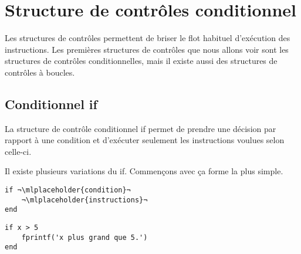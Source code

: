 \documentclass{tufte-handout}
\begin{document}
\section{Structure de contrôles conditionnel}
Les structures de contrôles permettent de briser le flot habituel d'exécution des instructions. Les premières structures de contrôles que nous allons voir sont les structures de contrôles conditionnelles, mais il existe aussi des structures de contrôles à boucles.
\subsection{Conditionnel if}
La structure de contrôle conditionnel if permet de prendre une décision par rapport à une condition et d'exécuter seulement les instructions voulues selon celle-ci.

Il existe plusieurs variations du if. Commençons avec ça forme la plus simple.

\begin{fullwidth}
    \begin{minipage}{.45\linewidth}
    \begin{lstlisting}[title={Structure du if simple}]
if ¬\mlplaceholder{condition}¬
    ¬\mlplaceholder{instructions}¬
end
    \end{lstlisting}
    \end{minipage}\hfill
    \begin{minipage}{.45\linewidth}
    \begin{lstlisting}[title={Exemple du if simple}]
if x > 5
    fprintf('x plus grand que 5.')
end
    \end{lstlisting}
    \end{minipage}
\end{fullwidth}
\end{document}
